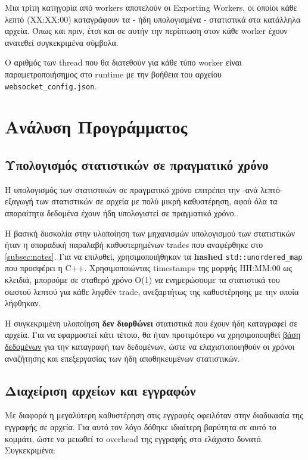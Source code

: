\documentclass[12pt]{article}
\begin{document}
Μια τρίτη κατηγορία από workers αποτελούν οι Exporting Workers, οι οποίοι κάθε λεπτό (XX:XX:00) καταγράφουν τα - ήδη υπολογισμένα - στατιστικά στα κατάλληλα αρχεία. Όπως και πριν, έτσι και σε αυτήν την περίπτωση στον κάθε worker έχουν ανατεθεί συγκεκριμένα σύμβολα.

Ο αριθμός των thread που θα διατεθούν για κάθε τύπο worker είναι παραμετροποιήσημος στο runtime με την βοήθεια του αρχείου \texttt{websocket\_config.json}.

\section{Ανάλυση Προγράμματος}
\subsection{Υπολογισμός στατιστικών σε πραγματικό χρόνο}
Η υπολογισμός των στατιστικών σε πραγματικό χρόνο επιτρέπει την -ανά λεπτό- εξαγωγή των στατιστικών σε αρχεία με πολύ μικρή καθυστέρηση, αφού όλα τα απαραίτητα δεδομένα έχουν ήδη υπολογιστεί σε πραγματικό χρόνο.

Η βασική δυσκολία στην υλοποίηση των μηχανισμών υπολογισμού των στατιστικών ήταν η σποραδική παραλαβή καθυστερημένων trades που αναφέρθηκε στο \ref{subsec:notes}. Για να επιλυθεί, χρησιμοποιήθηκαν τα \textbf{hashed} \texttt{std::unordered\_map} που προσφέρει η C++. Χρησιμοποιώντας timestamps της μορφής HH:MM:00 ως κλειδιά, μπορούμε σε σταθερό χρόνο O(1) να ενημερώσουμε τα στατιστικά του σωστού λεπτού για κάθε ληφθέν trade, ανεξαρτήτως της καθυστέρησης με την οποία λήφθηκαν.

Η συγκεκριμένη υλοποίηση \textbf{δεν διορθώνει} στατιστικά που έχουν ήδη καταγραφεί σε αρχεία. Για να εφαρμοστεί κάτι τέτοιο, θα ήταν προτιμότερο να χρησιμοποιηθεί \href{https://www.sqlite.org/}{βάση δεδομένων} για την καταγραφή των δεδομένων, ώστε να ελαχιστοποιηθούν οι χρόνοι αναζήτησης και επεξεργασίας των ήδη αποθηκευμένων στατιστικών. 

\subsection{Διαχείριση αρχείων και εγγραφών}

Με διαφορά η μεγαλύτερη καθυστέρηση στις εγγραφές οφειλόταν στην διαδικασία της εγγραφής σε αρχεία. Για αυτό τον λόγο δόθηκε ιδιαίτερη βαρύτητα σε αυτό το κομμάτι, ώστε να μειωθεί το overhead της εγγραφής στο ελάχιστο δυνατό. Συγκεκριμένα:
\end{document}
